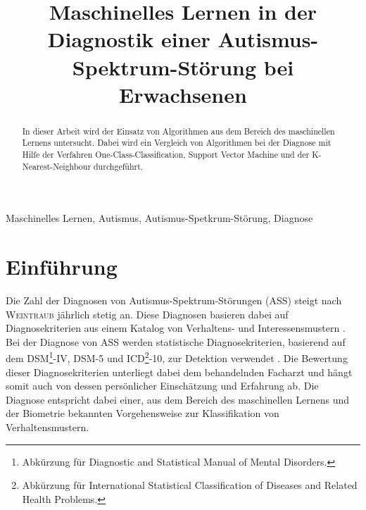 \documentclass[conference]{IEEEtran}
\begin{document}
\title{Maschinelles Lernen in der Diagnostik einer Autismus-Spektrum-Störung bei Erwachsenen}

\author{
}

\maketitle

\begin{abstract}
In dieser Arbeit wird der Einsatz von Algorithmen aus dem Bereich des maschinellen Lernens untersucht. Dabei wird ein Vergleich von Algorithmen bei der Diagnose mit Hilfe der Verfahren One-Class-Classification, Support Vector Machine und der K-Nearest-Neighbour durchgeführt.
\end{abstract}

\begin{IEEEkeywords}
Maschinelles Lernen, Autismus, Autismus-Spetkrum-Störung, Diagnose
\end{IEEEkeywords}

\section{Einführung}
Die Zahl der Diagnosen von Autismus-Spektrum-Störungen (ASS) steigt nach \textsc{Weintraub} \cite{Weintraub2011} jährlich stetig an. Diese Diagnosen basieren dabei auf Diagnosekriterien aus einem Katalog von Verhaltens- und Interessensmustern \cite{Weintraub2011, Thabtah2017, Thabtah2018, VanElst2014}. Bei der Diagnose von ASS werden statistische Diagnosekriterien, basierend auf dem DSM\footnote{\label{foot:1}Abkürzung für \glqq Diagnostic and Statistical Manual of Mental Disorders\grqq{}.}-IV, DSM-5 und ICD\footnote{\label{foot:2}Abkürzung für \glqq International Statistical Classification of Diseases and Related Health Problems\grqq{}.}-10, zur Detektion verwendet \cite{Thabtah2017, VanElst2014}. Die Bewertung dieser Diagnosekriterien unterliegt dabei dem behandelnden Facharzt und hängt somit auch von dessen persönlicher Einschätzung und Erfahrung ab. Die Diagnose entspricht dabei einer, aus dem Bereich des maschinellen Lernens und der Biometrie bekannten Vorgehensweise zur Klassifikation von Verhaltensmustern.
\end{document}
